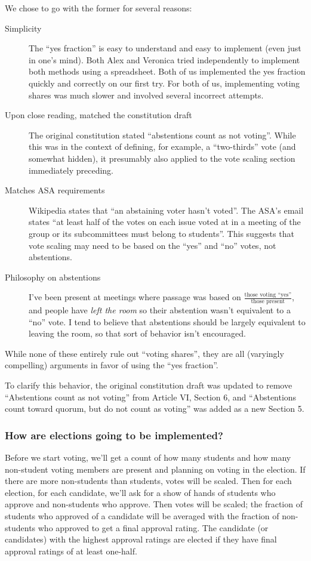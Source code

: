 \documentclass{article}
\begin{document}
We chose to go with the former for several reasons:
\begin{description}
\item[Simplicity] The ``yes fraction'' is easy to understand and easy to implement (even just in one's mind). Both Alex and Veronica tried independently to implement both methods using a spreadsheet. Both of us implemented the yes fraction quickly and correctly on our first try. For both of us, implementing voting shares was much slower and involved several incorrect attempts.
\item[Upon close reading, matched the constitution draft] The original constitution stated ``abstentions count as not voting''. While this was in the context of defining, for example, a ``two-thirds'' vote (and somewhat hidden), it presumably also applied to the vote scaling section immediately preceding.
\item[Matches ASA requirements] Wikipedia states that ``an abstaining voter hasn't voted''. The ASA's email states ``at least half of the votes on each issue voted at in a meeting of the group or its subcommittees must belong to students''. This suggests that vote scaling may need to be based on the ``yes'' and ``no'' votes, not abstentions.
\item[Philosophy on abstentions] I've been present at meetings where passage was based on $\frac{\mbox{those voting ``yes''}}{\mbox{those present}}$, and people have \emph{left the room} so their abstention wasn't equivalent to a ``no'' vote. I tend to believe that abstentions should be largely equivalent to leaving the room, so that sort of behavior isn't encouraged.
\end{description}

While none of these entirely rule out ``voting shares'', they are all (varyingly compelling) arguments in favor of using the ``yes fraction''.

To clarify this behavior, the original constitution draft was updated to remove ``Abstentions count as not voting'' from Article VI, Section 6, and ``Abstentions count toward quorum, but do not count as voting'' was added as a new Section 5.

\subsubsection*{How are elections going to be implemented?}
Before we start voting, we'll get a count of how many students and how many non-student voting members are present and planning on voting in the election. If there are more non-students than students, votes will be scaled.  Then for each election, for each candidate, we'll ask for a show of hands of students who approve and non-students who approve. Then votes will be scaled; the fraction of students who approved of a candidate will be averaged with the fraction of non-students who approved to get a final approval rating. The candidate (or candidates) with the highest approval ratings are elected if they have final approval ratings of at least one-half.
\end{document}
